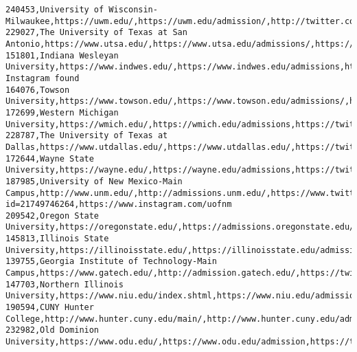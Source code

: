 \documentclass[11pt]{article}
\begin{document}
\begin{Verbatim}[commandchars=\\\{\}]
240453,University of Wisconsin-Milwaukee,https://uwm.edu/,https://uwm.edu/admission/,http://twitter.com/uwm,http://facebook.com/uwmilwaukee,http://instagram.com/uwmilwaukee
229027,The University of Texas at San Antonio,https://www.utsa.edu/,https://www.utsa.edu/admissions/,https://twitter.com/utsa,https://www.facebook.com/utsa,https://instagram.com/utsa
151801,Indiana Wesleyan University,https://www.indwes.edu/,https://www.indwes.edu/admissions,https://twitter.com/IndWes,https://www.facebook.com/IndWes,No Instagram found
164076,Towson University,https://www.towson.edu/,https://www.towson.edu/admissions/,http://twitter.com/TowsonU,https://www.facebook.com/towsonuniversity,http://instagram.com/towsonuniversity
172699,Western Michigan University,https://wmich.edu/,https://wmich.edu/admissions,https://twitter.com/WesternMichU,https://www.facebook.com/westernmichu/,https://www.instagram.com/westernmichu
228787,The University of Texas at Dallas,https://www.utdallas.edu/,https://www.utdallas.edu/,https://twitter.com/ut\_dallas,https://www.facebook.com/utdallas,https://www.instagram.com/ut\_dallas/
172644,Wayne State University,https://wayne.edu/,https://wayne.edu/admissions,https://twitter.com/waynestate,https://www.facebook.com/waynestateuniversity,https://www.instagram.com/waynestate/
187985,University of New Mexico-Main Campus,http://www.unm.edu/,http://admissions.unm.edu/,https://www.twitter.com/UNM,https://facebook.com/profile.php?id=21749746264,https://www.instagram.com/uofnm
209542,Oregon State University,https://oregonstate.edu/,https://admissions.oregonstate.edu/,https://twitter.com/oregonstate,https://www.facebook.com/osubeavers,https://instagram.com/oregonstate
145813,Illinois State University,https://illinoisstate.edu/,https://illinoisstate.edu/admissions/,https://twitter.com/IllinoisStateU,https://www.facebook.com/IllinoisStateUniversity,https://www.instagram.com/illinoisstateu/
139755,Georgia Institute of Technology-Main Campus,https://www.gatech.edu/,http://admission.gatech.edu/,https://twitter.com/georgiatech,https://www.facebook.com/georgiatech,https://instagram.com/georgiatech
147703,Northern Illinois University,https://www.niu.edu/index.shtml,https://www.niu.edu/admissions/,https://twitter.com/NIUlive,https://www.facebook.com/NorthernIllUniv,https://instagram.com/northern\_illinois\_university
190594,CUNY Hunter College,http://www.hunter.cuny.edu/main/,http://www.hunter.cuny.edu/admissions/,http://www.twitter.com/hunter\_college,https://www.facebook.com/huntercollege,http://instagram.com/huntercollege
232982,Old Dominion University,https://www.odu.edu/,https://www.odu.edu/admission,https://twitter.com/odu,https://www.facebook.com/Old.Dominion.University,https://instagram.com/olddominionu

\end{Verbatim}
\end{document}
